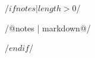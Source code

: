 /$ if notes | length > 0 $/
\begin{multicols*}{3}[\noindent {\Large \color{cyberred}{Notes}}]

/@notes | markdown@/

\end{multicols*}
/$endif$/